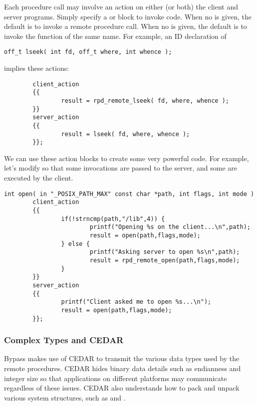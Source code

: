 Each procedure call may involve an action on either (or both) the client and server programs.  Simply specify a  or  block to invoke code.  When no  is given, the default is to invoke a remote procedure call.  When no  is given, the default is to invoke the function of the same name.  For example, an ID declaration of 

\begin{verbatim}
off_t lseek( int fd, off_t where, int whence );
\end{verbatim}

implies these actions:

\begin{verbatim}
        client_action
        {{
                result = rpd_remote_lseek( fd, where, whence );
        }}
        server_action
        {{
                result = lseek( fd, where, whence );
        }};
\end{verbatim}

We can use these action blocks to create some very powerful code.  For example, let's modify  so that some invocations are passed to the server, and some are executed by the client.

\begin{verbatim}
int open( in "_POSIX_PATH_MAX" const char *path, int flags, int mode )
        client_action
        {{
                if(!strncmp(path,"/lib",4)) {
                        printf("Opening %s on the client...\n",path);
                        result = open(path,flags,mode);
                } else {
                        printf("Asking server to open %s\n",path);
                        result = rpd_remote_open(path,flags,mode);
                }
        }}
        server_action
        {{
                printf("Client asked me to open %s...\n");
                result = open(path,flags,mode);
        }};
\end{verbatim}

\subsubsection{Complex Types and CEDAR}

Bypass makes use of CEDAR to transmit the various data types used by
the remote procedures.  CEDAR hides binary data details such as
endianness and integer size so that applications on different platforms
may communicate regardless of these issues.
CEDAR also understands how to pack and unpack
various system structures, such as  and
.

